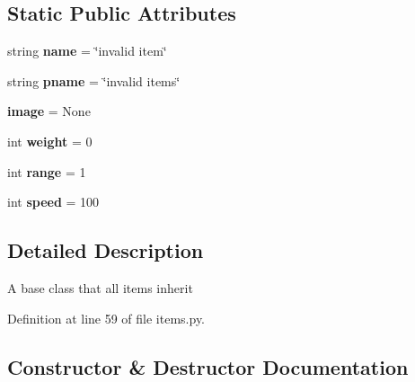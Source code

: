 \subsection*{Static Public Attributes}
\begin{DoxyCompactItemize}
\item 
\hypertarget{classitems_1_1_item_abf64fea9fbcc7043f3184ffc37d65950}{}string {\bfseries name} = \char`\"{}invalid item\char`\"{}\label{classitems_1_1_item_abf64fea9fbcc7043f3184ffc37d65950}

\item 
\hypertarget{classitems_1_1_item_ad2bebd862fd7946cca66fc0f64ea5e09}{}string {\bfseries pname} = \char`\"{}invalid items\char`\"{}\label{classitems_1_1_item_ad2bebd862fd7946cca66fc0f64ea5e09}

\item 
\hypertarget{classitems_1_1_item_ab9fed7c1852d23d4a57c3e12ad8136b2}{}{\bfseries image} = None\label{classitems_1_1_item_ab9fed7c1852d23d4a57c3e12ad8136b2}

\item 
\hypertarget{classitems_1_1_item_a1266b1cd6af34fa84d82403835d23bf2}{}int {\bfseries weight} = 0\label{classitems_1_1_item_a1266b1cd6af34fa84d82403835d23bf2}

\item 
\hypertarget{classitems_1_1_item_a81faa14096a4f3f3c9b0d8fa73be145a}{}int {\bfseries range} = 1\label{classitems_1_1_item_a81faa14096a4f3f3c9b0d8fa73be145a}

\item 
\hypertarget{classitems_1_1_item_a6ad6faef70d37fb376bef114d0f5286b}{}int {\bfseries speed} = 100\label{classitems_1_1_item_a6ad6faef70d37fb376bef114d0f5286b}

\end{DoxyCompactItemize}


\subsection{Detailed Description}
\begin{DoxyVerb}A base class that all items inherit
\end{DoxyVerb}
 

Definition at line 59 of file items.\+py.



\subsection{Constructor \& Destructor Documentation}
\hypertarget{classitems_1_1_item_ae3de3fd45b979ded986138a71d80441d}{}
